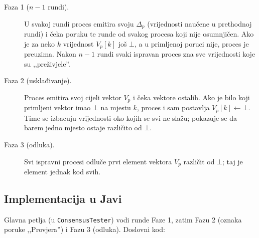 \documentclass[11pt,a4paper]{article}
\begin{document}
\begin{description}
  \item[Faza 1 ($n-1$ rundi).] U svakoj rundi proces emitira svoju $\Delta_p$
  (vrijednosti naučene u prethodnoj rundi) i čeka poruku te runde od svakog
  procesa koji nije osumnjičen. Ako je za neko $k$ vrijednost $V_p[k]$ još $\bot$,
  a u primljenoj poruci nije, proces je preuzima. Nakon $n-1$ rundi svaki
  ispravan proces zna sve vrijednosti koje su ,,preživjele''.
  \item[Faza 2 (usklađivanje).] Proces emitira svoj cijeli vektor $V_p$ i čeka
  vektore ostalih. Ako je bilo koji primljeni vektor imao $\bot$ na mjestu $k$,
  proces i sam postavlja $V_p[k] \gets \bot$. Time se izbacuju vrijednosti oko
  kojih se svi ne slažu; pokazuje se da barem jedno mjesto ostaje različito od
  $\bot$.
  \item[Faza 3 (odluka).] Svi ispravni procesi odluče prvi element vektora $V_p$
  različit od $\bot$; taj je element jednak kod svih.
\end{description}

\subsection{Implementacija u Javi}

Glavna petlja (u \texttt{ConsensusTester}) vodi runde Faze 1, zatim Fazu 2
(oznaka poruke ,,Provjera'') i Fazu 3 (odluka). Doslovni kod:
\end{document}
